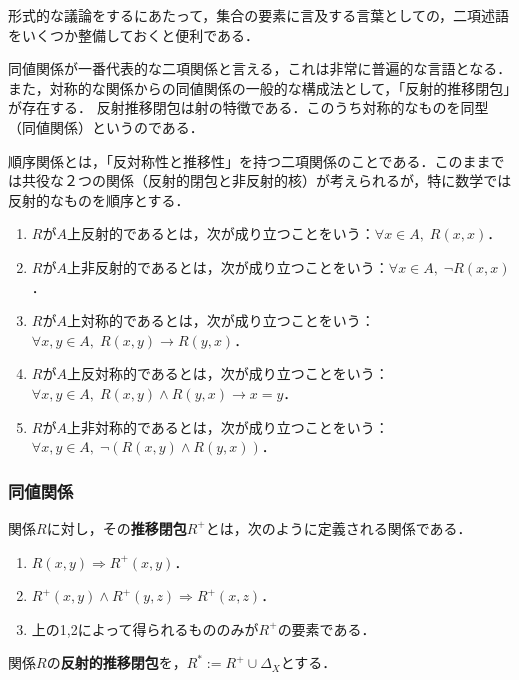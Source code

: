 \documentclass[uplatex, dvipdfmx]{jsreport}
\begin{document}
\begin{screen}
    形式的な議論をするにあたって，集合の要素に言及する言葉としての，二項述語をいくつか整備しておくと便利である．

    同値関係が一番代表的な二項関係と言える，これは非常に普遍的な言語となる．また，対称的な関係からの同値関係の一般的な構成法として，「反射的推移閉包」が存在する．
    反射推移閉包は射の特徴である．このうち対称的なものを同型（同値関係）というのである．

    順序関係とは，「反対称性と推移性」を持つ二項関係のことである．このままでは共役な２つの関係（反射的閉包と非反射的核）が考えられるが，特に数学では
    反射的なものを順序とする．
\end{screen}

\begin{definition}\mbox{}
    \begin{enumerate}
        \item $R$が$A$上反射的であるとは，次が成り立つことをいう：$\forall x\in A,\; R(x,x)$．
        \item $R$が$A$上非反射的であるとは，次が成り立つことをいう：$\forall x\in A,\;\lnot R(x,x)$．
        \item $R$が$A$上対称的であるとは，次が成り立つことをいう：$\forall x,y\in A,\;R(x,y)\to R(y,x)$．
        \item $R$が$A$上反対称的であるとは，次が成り立つことをいう：$\forall x,y\in A,\; R(x,y)\land R(y,x)\to x=y$．
        \item $R$が$A$上非対称的であるとは，次が成り立つことをいう：$\forall x,y\in A,\; \lnot(R(x,y)\land R(y,x))$．
    \end{enumerate}
\end{definition}

\subsubsection*{同値関係}

\begin{definition}
    関係$R$に対し，その\textbf{推移閉包}$R^+$とは，次のように定義される関係である．
    \begin{enumerate}
        \item $R(x,y)\Rightarrow R^+(x,y)$．
        \item $R^+(x,y)\land R^+(y,z)\Rightarrow R^+(x,z)$．
        \item 上の1,2によって得られるもののみが$R^+$の要素である．
    \end{enumerate}
    関係$R$の\textbf{反射的推移閉包}を，$R^*:=R^+\cup\Delta_X$とする．
\end{definition}
\end{document}
